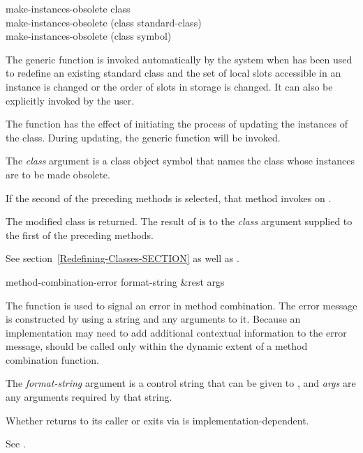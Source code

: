 \begin{defun}
make-instances-obsolete class \\
make-instances-obsolete (class standard-class) \\
make-instances-obsolete (class symbol)

The generic function  is invoked
automatically by the system when  has been used to
redefine an existing standard class and the set of local slots accessible in an
instance is changed or the order of slots in storage is changed.  It
can also be explicitly invoked by the user.

The function  has the effect of
initiating the process of updating the instances of the
class. During updating, the generic function 
 will be invoked.





The {\it class\/} argument is a class object symbol that names
the class whose instances are to be made obsolete.

If the second of the preceding methods is selected, that method invokes
 on .


The modified class is returned.  The result of 
is  to the {\it class} argument supplied to the first of the preceding
methods.

See section~\ref{Redefining-Classes-SECTION} as well as
.
\end{defun}



\begin{defun}[Function]
method-combination-error format-string &rest args

The function  is used to signal an error
in method combination.  The error message is constructed by using a
 string and any arguments to it.  Because an implementation may
need to add additional contextual information to the error message,
 should be called only within the
dynamic extent of a method combination function.



 

The {\it format-string\/} argument is a control string that can be
given to , and {\it args\/} are any arguments required by
that string.


Whether  returns to its caller or exits
via  is implementation-dependent.

See .

\end{defun}



